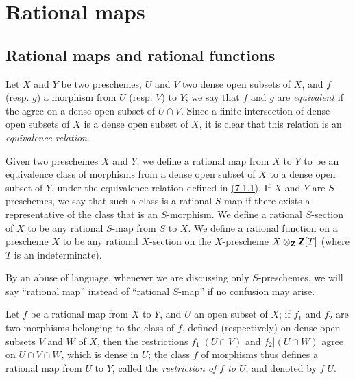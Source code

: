 \section{Rational maps}
\label{section-rational-maps}

\subsection{Rational maps and rational functions}
\label{subsection-rational-maps-and-rational-functions}

\begin{env}[7.1.1]
\label{1.7.1.1}
Let $X$ and $Y$ be two preschemes, $U$ and $V$ two dense open subsets of $X$, and $f$ (resp. $g$) a morphism from $U$ (resp. $V$) to $Y$; we say that $f$ and $g$ are \emph{equivalent} if the agree on a dense open subset of $U\cap V$.
Since a finite intersection of dense open subsets of $X$ is a dense open subset of $X$, it is clear that this relation is an \emph{equivalence relation}.
\end{env}

\begin{defn}[7.1.2]
\label{1.7.1.2}
Given two preschemes $X$ and $Y$, we define a rational map from $X$ to $Y$ to be an equivalence class of morphisms from a dense open subset of $X$ to a dense open subset of $Y$, under the equivalence relation defined in \hyperref[1.7.1.1]{(7.1.1)}.
If $X$ and $Y$ are $S$-preschemes, we say that such a class is a rational $S$-map if there exists a representative of the class that is an $S$-morphism.
We define a rational $S$-section of $X$ to be any rational $S$-map from $S$ to $X$.
We define a rational function on a prescheme $X$ to be any rational $X$-section on the $X$-prescheme $X\otimes_{\mathbf{Z}}\mathbf{Z}[T]$ (where $T$ is an indeterminate).
\end{defn}

By an abuse of language, whenever we are discussing only $S$-preschemes, we will say ``rational map'' instead of ``rational $S$-map'' if no confusion may arise.

Let $f$ be a rational map from $X$ to $Y$, and $U$ an open subset of $X$; if $f_1$ and $f_2$ are two morphisms belonging to the class of $f$, defined (respectively) on dense open subsets $V$ and $W$ of $X$, then the restrictions $f_1|(U\cap V)$ and $f_2|(U\cap W)$ agree on $U\cap V\cap W$, which is dense in $U$; the class $f$ of morphisms thus defines a rational map from $U$ to $Y$, called the \emph{restriction of $f$ to $U$}, and denoted by $f|U$.

